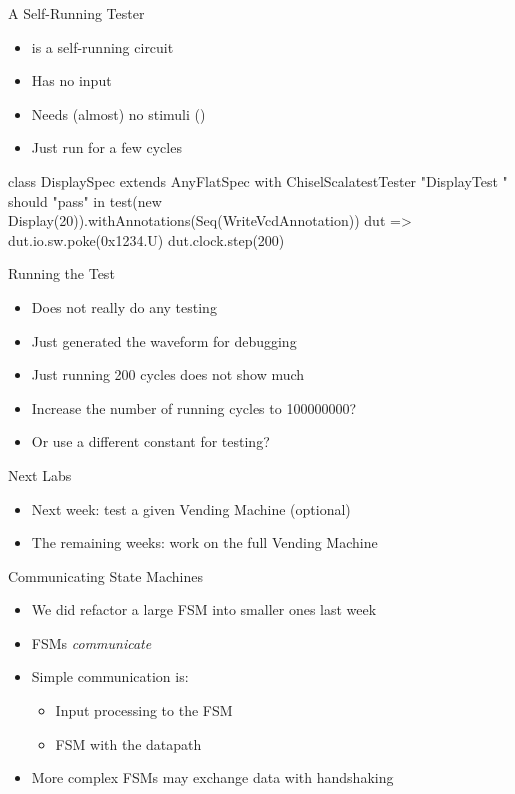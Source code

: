 \begin{frame}[fragile]{A Self-Running Tester}
\begin{itemize}
\item {} is a self-running circuit
\item Has no input
\item Needs (almost) no stimuli ()
\item Just run for a few cycles
\end{itemize}
\begin{chisel}
class DisplaySpec extends AnyFlatSpec with ChiselScalatestTester {
  "DisplayTest " should "pass" in {
    test(new Display(20)).withAnnotations(Seq(WriteVcdAnnotation)) { dut =>
      dut.io.sw.poke(0x1234.U)
      dut.clock.step(200)
    }
  }
}
\end{chisel}
\end{frame}


\begin{frame}[fragile]{Running the Test}
\begin{itemize}
\item Does not really do any testing
\item Just generated the waveform for debugging
\item Just running 200 cycles does not show much
\item Increase the number of running cycles to 100000000?
\item Or use a different constant for testing?
\end{itemize}
\end{frame}





\begin{frame}[fragile]{Next Labs}
\begin{itemize}
\item Next week: test a given Vending Machine (optional)
\item The remaining weeks: work on the full Vending Machine
\end{itemize}
\end{frame}



\begin{frame}[fragile]{Communicating State Machines}
\begin{itemize}
\item We did refactor a large FSM into smaller ones last week
\item FSMs \emph{communicate}
\item Simple communication is:
\begin{itemize}
\item Input processing to the FSM
\item FSM with the datapath
\end{itemize}
\item More complex FSMs may exchange data with handshaking
\end{itemize}
\end{frame}


